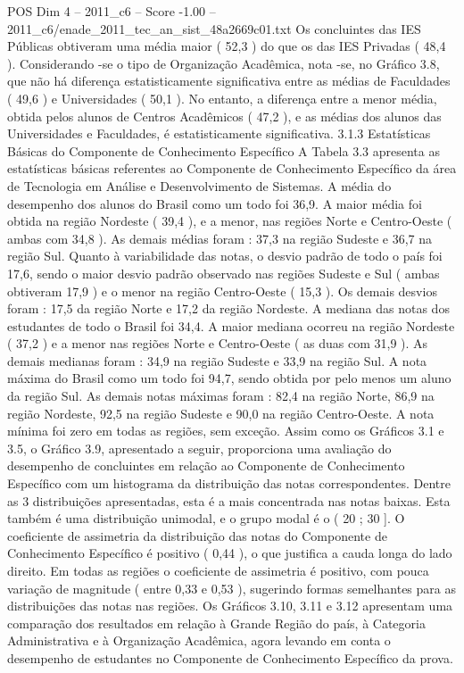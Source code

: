 \begin{textsample}{POS Dim 4 – 2011\_c6 – Score -1.00 – 2011\_c6/enade\_2011\_tec\_an\_sist\_48a2669c01.txt}
Os concluintes das IES Públicas obtiveram uma média maior ( 52,3 ) do que os das IES Privadas ( 48,4 ).
Considerando -se o tipo de Organização Acadêmica, nota -se, no Gráfico 3.8, que não há diferença estatisticamente significativa entre as médias de Faculdades ( 49,6 ) e Universidades ( 50,1 ).
No entanto, a diferença entre a menor média, obtida pelos alunos de Centros Acadêmicos ( 47,2 ), e as médias dos alunos das Universidades e Faculdades, é estatisticamente significativa. 3.1.3 Estatísticas Básicas do Componente de Conhecimento Específico A Tabela 3.3 apresenta as estatísticas básicas referentes ao Componente de Conhecimento Específico da área de Tecnologia em Análise e Desenvolvimento de Sistemas.
A média do desempenho dos alunos do Brasil como um todo foi 36,9.
A maior média foi obtida na região Nordeste ( 39,4 ), e a menor, nas regiões Norte e Centro-Oeste ( ambas com 34,8 ).
As demais médias foram : 37,3 na região Sudeste e 36,7 na região Sul.
Quanto à variabilidade das notas, o desvio padrão de todo o país foi 17,6, sendo o maior desvio padrão observado nas regiões Sudeste e Sul ( ambas obtiveram 17,9 ) e o menor na região Centro-Oeste ( 15,3 ).
Os demais desvios foram : 17,5 da região Norte e 17,2 da região Nordeste.
A mediana das notas dos estudantes de todo o Brasil foi 34,4.
A maior mediana ocorreu na região Nordeste ( 37,2 ) e a menor nas regiões Norte e Centro-Oeste ( as duas com 31,9 ).
As demais medianas foram : 34,9 na região Sudeste e 33,9 na região Sul.
A nota máxima do Brasil como um todo foi 94,7, sendo obtida por pelo menos um aluno da região Sul.
As demais notas máximas foram : 82,4 na região Norte, 86,9 na região Nordeste, 92,5 na região Sudeste e 90,0 na região Centro-Oeste.
A nota mínima foi zero em todas as regiões, sem exceção.
Assim como os Gráficos 3.1 e 3.5, o Gráfico 3.9, apresentado a seguir, proporciona uma avaliação do desempenho de concluintes em relação ao Componente de Conhecimento Específico com um histograma da distribuição das notas correspondentes.
Dentre as 3 distribuições apresentadas, esta é a mais concentrada nas notas baixas.
Esta também é uma distribuição unimodal, e o grupo modal é o ( 20 ; 30 ].
O coeficiente de assimetria da distribuição das notas do Componente de Conhecimento Específico é positivo ( 0,44 ), o que justifica a cauda longa do lado direito.
Em todas as regiões o coeficiente de assimetria é positivo, com pouca variação de magnitude ( entre 0,33 e 0,53 ), sugerindo formas semelhantes para as distribuições das notas nas regiões.
Os Gráficos 3.10, 3.11 e 3.12 apresentam uma comparação dos resultados em relação à Grande Região do país, à Categoria Administrativa e à Organização Acadêmica, agora levando em conta o desempenho de estudantes no Componente de Conhecimento Específico da prova.

\end{textsample}
